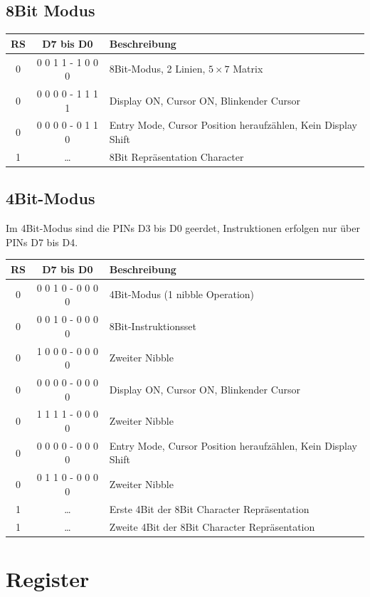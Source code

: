 \documentclass[a4paper,11pt]{article}
\begin{document}
\subsection*{8Bit Modus}
\begin{tabular}{| c | c | l |}
	\hline
	\textbf{RS} & \textbf{D7 bis D0} & \textbf{Beschreibung} \\\hline
	0 & 0 0 1 1 - 1 0 0 0 & 8Bit-Modus, 2 Linien, $5 \times 7$ Matrix \\\hline
	0 & 0 0 0 0 - 1 1 1 1 & Display ON, Cursor ON, Blinkender Cursor \\\hline
	0 & 0 0 0 0 - 0 1 1 0 & Entry Mode, Cursor Position heraufzählen, Kein Display Shift\\\hline
	1 & \ldots & 8Bit Repräsentation Character\\\hline
\end{tabular}

\subsection*{4Bit-Modus}
Im 4Bit-Modus sind die PINs D3 bis D0 geerdet, Instruktionen erfolgen nur über PINs D7 bis D4.
\begin{tabular}{| c | c | l |}
	\hline
	\textbf{RS} & \textbf{D7 bis D0} & \textbf{Beschreibung} \\\hline
	0 & 0 0 1 0 - 0 0 0 0 & 4Bit-Modus (1 nibble Operation)\\\hline
	0 & 0 0 1 0 - 0 0 0 0 & 8Bit-Instruktionsset \\\hline
	0 & 1 0 0 0 - 0 0 0 0 & Zweiter Nibble \\\hline
	
	0 & 0 0 0 0 - 0 0 0 0 & Display ON, Cursor ON, Blinkender Cursor\\\hline
	0 & 1 1 1 1 - 0 0 0 0 & Zweiter Nibble \\\hline
	
	0 & 0 0 0 0 - 0 0 0 0 &  Entry Mode, Cursor Position heraufzählen, Kein Display Shift\\\hline
	0 & 0 1 1 0 - 0 0 0 0 & Zweiter Nibble \\\hline
		
	
	
	1 & \ldots & Erste 4Bit der 8Bit Character Repräsentation \\\hline
	1 & \ldots & Zweite 4Bit der 8Bit Character Repräsentation \\\hline
\end{tabular}

\section*{Register}
\end{document}
